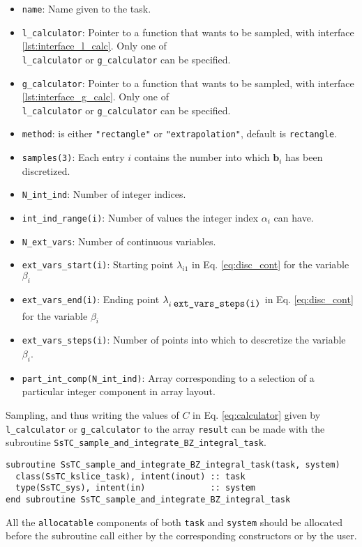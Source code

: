 \documentclass[10pt,a4paper]{article}
\begin{document}
\begin{itemize}
\item \verb|name|: Name given to the task.
\item \verb|l_calculator|: Pointer to a function that wants to be sampled, with interface \ref{lst:interface_l_calc}. Only one of \\ \verb|l_calculator| or \verb|g_calculator| can be specified.
\item \verb|g_calculator|: Pointer to a function that wants to be sampled, with interface \ref{lst:interface_g_calc}. Only one of \\ \verb|l_calculator| or \verb|g_calculator| can be specified.
\item \verb|method|: is either \verb|"rectangle"| or \verb|"extrapolation"|, default is \verb|rectangle|.
\item \verb|samples(3)|: Each entry $i$ contains the number into which $\bm{b}_i$ has been discretized.
\item \verb|N_int_ind|: Number of integer indices.
\item \verb|int_ind_range(i)|: Number of values the integer index $\alpha_i$ can have.
\item \verb|N_ext_vars|: Number of continuous variables.
\item \verb|ext_vars_start(i)|: Starting point $\lambda_{i1}$ in Eq. \eqref{eq:disc_cont} for the variable $\beta_i$
\item \verb|ext_vars_end(i)|: Ending point $\lambda_{i\;\verb|ext_vars_steps(i)|}$ in Eq. \eqref{eq:disc_cont} for the variable $\beta_i$
\item \verb|ext_vars_steps(i)|: Number of points into which to descretize the variable $\beta_i$.
\item \verb|part_int_comp(N_int_ind)|: Array corresponding to a selection of a particular integer component in array layout.
\end{itemize}
Sampling, and thus writing the values of $C$ in Eq. \eqref{eq:calculator} given by \verb|l_calculator| or \verb|g_calculator| to the array \verb|result| can be made with the subroutine \verb|SsTC_sample_and_integrate_BZ_integral_task|.
\begin{lstlisting}[caption={Interface of the ``integrator" sampler.},captionpos=b]
subroutine SsTC_sample_and_integrate_BZ_integral_task(task, system)
  class(SsTC_kslice_task), intent(inout) :: task
  type(SsTC_sys), intent(in)             :: system
end subroutine SsTC_sample_and_integrate_BZ_integral_task
\end{lstlisting}
All the \verb|allocatable| components of both \verb|task| and \verb|system| should be allocated before the subroutine call either by the corresponding constructors or by the user.
\end{document}
